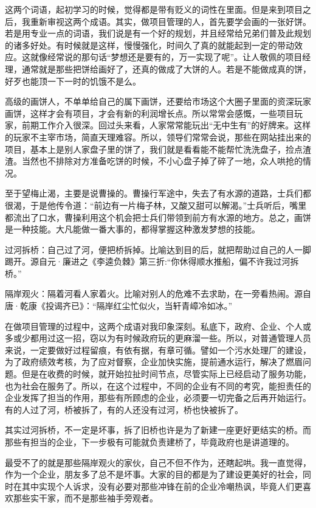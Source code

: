 \documentclass[
]{book}
\begin{document}
这两个词语，起初学习的时候，觉得都是带有贬义的词性在里面。但是来到项目之后，我重新审视这两个成语。其实，做项目管理的人，首先要学会画的一张好饼。若是用专业一点的词语，我们说是有一个好的规划，并且经常给兄弟们普及此规划的诸多好处。有时候就是这样，慢慢强化，时间久了真的就能起到一定的带动效应。这就像经常说的那句话``梦想还是要有的，万一实现了呢''。让人敬佩的项目经理，通常就是那些把饼给画好了，还真的做成了大饼的人。若是不能做成真的饼，好歹也能顶一下一时的饥饿不是么。

高级的画饼人，不单单给自己的属下画饼，还要给市场这个大圈子里面的资深玩家画饼，这样才会有项目，才会有新的利润增长点。所以常常会感慨，一些项目玩家，前期工作介入很深。回过头来看，人家常常能玩出``无中生有''的好牌来。这样的玩家不主宰市场，简直天理难容。所以，领导们常常会说，那些在网站挂出来的项目，基本上是别人家盘子里的饼了，我们就是看看能不能帮忙洗洗盘子，捡点渣渣。当然也不排除对方准备吃饼的时候，不小心盘子掉了碎了一地，众人哄抢的情况。

至于望梅止渴，主要是说曹操的。曹操行军途中，失去了有水源的道路，士兵们都很渴，于是他传令道：``前边有一片梅子林，又酸又甜可以解渴。''士兵听后，嘴里都流出了口水，曹操利用这个机会把士兵们带领到前方有水源的地方。总之，画饼是一种技能。大凡能做一番大事的，都得掌握这种激发梦想的技能。

过河拆桥：自己过了河，便把桥拆掉。比喻达到目的后，就把帮助过自己的人一脚踢开。源自元·廉进之《李逵负棘》第三折:``你休得顺水推船，偏不许我过河拆桥。''

隔岸观火：隔着河看人家着火。比喻对别人的危难不去求助，在一旁看热闹。源自唐·乾康《投谒齐已》：``隔岸红尘忙似火，当轩青嶂冷如冰。''

在做项目管理的过程中，这两个成语对我印象深刻。私底下，政府、企业、个人或多或少都用过这一招，窃以为有时候政府玩的更麻溜一些。所以，对普通管理人员来说，一定要做好过程留痕，有依有据，有章可循。譬如一个污水处理厂的建设，为了政府绩效考核，为了应对督察，企业加快实施，提前通水运行，解决了燃眉问题。但是在收费的时候，就开始拉扯时间节点，尽管实际上已经启动了服务功能，也为社会在服务了。所以，在这个过程中，不同的企业有不同的考究，能担责任的企业发挥了担当的作用，那些有所顾虑的企业，必须要一切完备之后再开始运行。有的人过了河，桥被拆了，有的人还没有过河，桥也快被拆了。

其实过河拆桥，不一定是坏事，拆了旧桥也许是为了新建一座更好更结实的桥。而那些有担当的企业，下一步极有可能就负责建桥了，毕竟政府也是讲道理的。

最受不了的就是那些隔岸观火的家伙，自己不但不作为，还瞎起哄。我一直觉得，作为一个企业，朋友多了总不是坏事。大家的目的都是为了建设更美好的社会，同时在其中实现个人诉求，没有必要对那些冲锋在前的企业冷嘲热讽，毕竟人们更喜欢那些实干家，而不是那些袖手旁观者。
\end{document}
